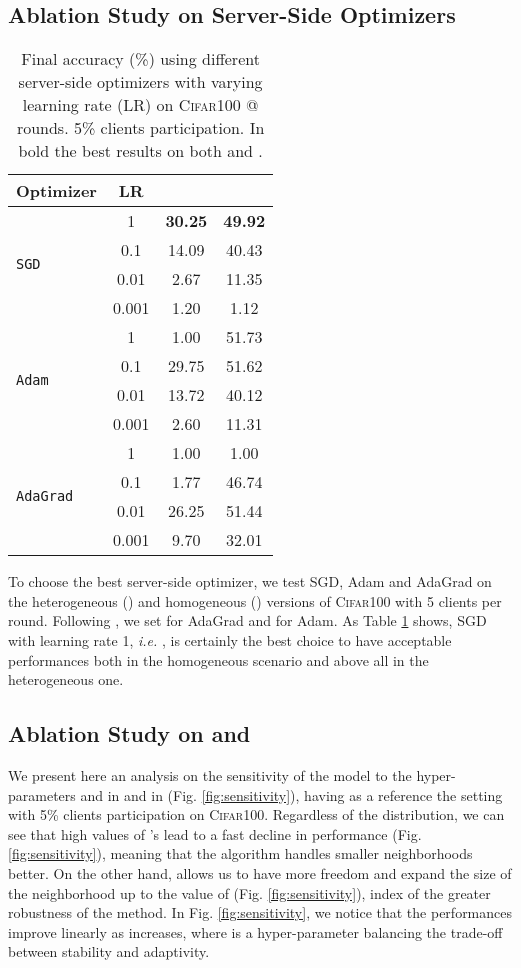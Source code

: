 \subsection{Ablation Study on Server-Side Optimizers}
\label{app:server_optims}
\begin{table}[t]\centering
\caption{Final accuracy (\%) using different server-side optimizers with varying learning rate (LR) on \textsc{Cifar100} @  rounds. 5\% clients participation. In bold the best results on both  and .}\label{tab:server_optim}
\scriptsize
\setlength\tabcolsep{0.5cm}
    \begin{tabular}{lccc}
    \toprule
    Optimizer & LR &  & \\
    \midrule
    \multirow{4}{*}{\texttt{SGD}} & 1 &\textbf{30.25}&\textbf{49.92}\\
    & 0.1 & 14.09 & 40.43\\
    & 0.01 & 2.67&11.35\\
    & 0.001 & 1.20 &1.12\\\midrule
    \multirow{4}{*}{\texttt{Adam}} & 1 & 1.00&{51.73}\\
    & 0.1 & 29.75&51.62\\
    & 0.01 & 13.72&40.12\\
    & 0.001 & 2.60&11.31\\\midrule
    \multirow{4}{*}{\texttt{AdaGrad}} & 1 & 1.00 &1.00\\
    & 0.1 & 1.77 &46.74\\
    & 0.01 & 26.25&51.44\\
    & 0.001 & 9.70&32.01\\
    \bottomrule
    \end{tabular}
\end{table} To choose the best server-side optimizer, we test SGD, Adam and AdaGrad on the heterogeneous () and homogeneous () versions of \textsc{Cifar100} with 5 clients per round. Following \cite{reddi2020adaptive}, we set  for AdaGrad and  for Adam. As Table \ref{tab:server_optim} shows, SGD with learning rate 1, \textit{i.e.} \fedavg, is certainly the best choice to have acceptable performances both in the homogeneous scenario and above all in the heterogeneous one.

\subsection{Ablation Study on \sam and \asam}
We present here an analysis on the sensitivity of the model to the hyper-parameters  and  in \asam and  in \sam (Fig. \ref{fig:sensitivity}), having as a reference the setting with 5\% clients participation on \textsc{Cifar100}. Regardless of the distribution, we can see that high values of \sam's  lead to a fast decline in performance (Fig. \ref{fig:sensitivity}{\color{red}{a}}), meaning that the algorithm handles smaller neighborhoods better. On the other hand, \asam allows us to have more freedom and expand the size of the neighborhood up to the value of  (Fig. \ref{fig:sensitivity}{\color{red}{b}}), index of the greater robustness of the method. In Fig. \ref{fig:sensitivity}{\color{red}{c}}, we notice that the performances improve linearly as  increases, where  is a hyper-parameter balancing the trade-off between stability and adaptivity.

